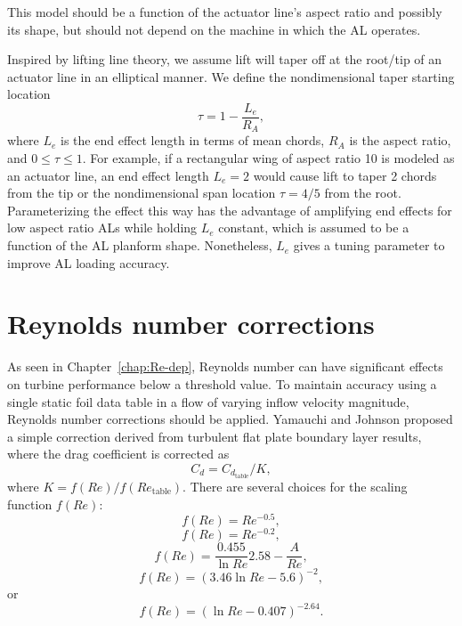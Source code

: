 This model should be a function of the actuator line's aspect ratio and possibly
its shape, but should not depend on the machine in which the AL operates.

Inspired by lifting line theory, we assume lift will taper off at the root/tip
of an actuator line in an elliptical manner. We define the nondimensional taper
starting location
\begin{equation}
    \tau = 1 - \frac{L_e}{R_A}, 
    \label{eq:end-length}
\end{equation}
where $L_e$ is the end effect length in terms of mean chords, $R_A$ is the
aspect ratio, and $0 \le \tau \le 1$. For example, if a rectangular wing of
aspect ratio 10 is modeled as an actuator line, an end effect length $L_e = 2$
would cause lift to taper 2 chords from the tip or the nondimensional span
location $\tau = 4/5$ from the root. Parameterizing the effect this way has the
advantage of amplifying end effects for low aspect ratio ALs while holding $L_e$
constant, which is assumed to be a function of the AL planform shape.
Nonetheless, $L_e$ gives a tuning parameter to improve AL loading accuracy.


\section{Reynolds number corrections}

As seen in Chapter~\ref{chap:Re-dep}, Reynolds number can have significant
effects on turbine performance below a threshold value. To maintain accuracy
using a single static foil data table in a flow of varying inflow velocity
magnitude, Reynolds number corrections should be applied. Yamauchi and Johnson
\cite{Yamauchi1983} proposed a simple correction derived from turbulent flat
plate boundary layer results, where the drag coefficient is corrected as
\begin{equation}
C_d = C_{d_{\mathrm{table}}}/ K,
\label{eq:cd-correction}
\end{equation}
where $K = f(Re)/f(Re_\mathrm{table})$. There are several choices for the
scaling function $f(Re)$:
\begin{equation}
f(Re) = Re^{-0.5},
\end{equation}
\begin{equation}
f(Re) = Re^{-0.2},
\end{equation}
\begin{equation}
f(Re) = \frac{0.455}{\ln Re}2.58 - \frac{A}{Re},
\end{equation}
\begin{equation}
f(Re) = (3.46 \ln Re - 5.6)^{-2},
\end{equation}
or
\begin{equation}
f(Re) = (\ln Re - 0.407)^{-2.64}.
\end{equation}

